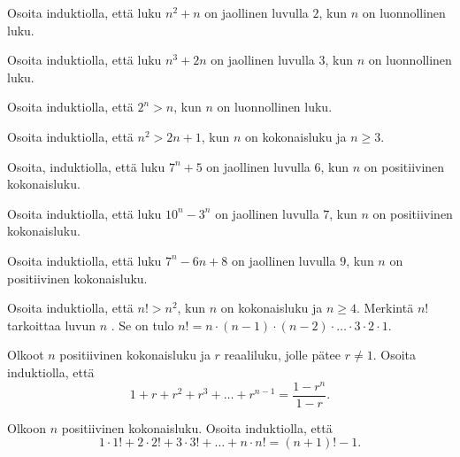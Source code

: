 \begin{tehtavasivu}

\begin{tehtava}
	Osoita induktiolla, että luku $n^2+n$ on jaollinen luvulla $2$, kun $n$ on luonnollinen luku.
\end{tehtava}

\begin{tehtava}
	Osoita induktiolla, että luku $n^3+2n$ on jaollinen luvulla $3$, kun $n$ on luonnollinen luku.
\end{tehtava}

\begin{tehtava}
	Osoita induktiolla, että $2^n > n$, kun $n$ on luonnollinen luku.
\end{tehtava}

\begin{tehtava}
	Osoita induktiolla, että $n^2 > 2n + 1$, kun $n$ on kokonaisluku ja $n \ge 3$.
\end{tehtava}

\begin{tehtava}
	Osoita, induktiolla, että luku $7^n + 5$ on jaollinen luvulla $6$, kun $n$ on positiivinen kokonaisluku.
\end{tehtava}

\begin{tehtava}
	Osoita induktiolla, että luku $10^n - 3^n$ on jaollinen luvulla $7$, kun $n$ on positiivinen kokonaisluku.
\end{tehtava}

\begin{tehtava}
	Osoita induktiolla, että luku $7^n - 6n + 8$ on jaollinen luvulla $9$, kun $n$ on positiivinen kokonaisluku.
\end{tehtava}

\begin{tehtava}
	Osoita induktiolla, että $n! > n^2$, kun $n$ on kokonaisluku ja $n \ge 4$. Merkintä $n!$ tarkoittaa luvun $n$ . Se on tulo $n! = n \cdot (n-1) \cdot (n-2) \cdot \ldots \cdot 3 \cdot 2 \cdot 1$.
\end{tehtava}

\begin{tehtava}
	Olkoot $n$ positiivinen kokonaisluku ja $r$ reaaliluku, jolle pätee $r \neq 1$. Osoita induktiolla, että 
	\[
	1 + r + r^2 + r^3 + \ldots + r^{n-1} = \frac{1-r^n}{1-r}.
	\]
\end{tehtava}

\begin{tehtava}
	Olkoon $n$ positiivinen kokonaisluku. Osoita induktiolla, että 
	\[
	1 \cdot 1! + 2 \cdot 2! + 3 \cdot 3! + \ldots + n \cdot n! = (n + 1)! - 1.
	\]
\end{tehtava}


\end{tehtavasivu}

